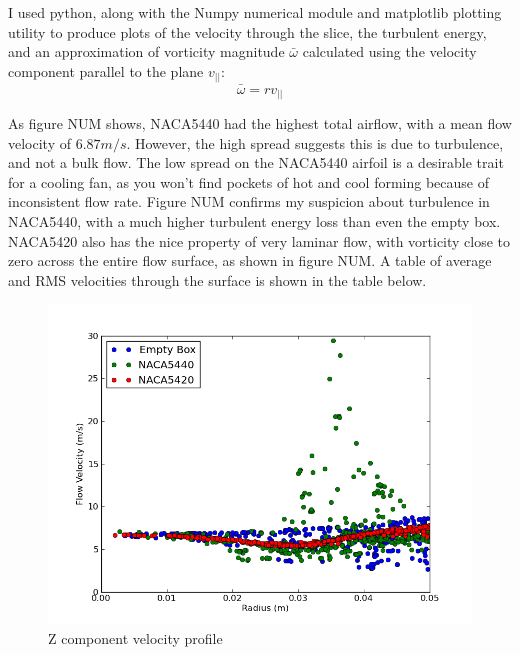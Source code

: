 \documentclass[12pt]{article}
\begin{document}
I used python, along with the Numpy numerical module and matplotlib plotting
utility to produce plots of the velocity through the slice, the turbulent energy, and an approximation of vorticity magnitude $\bar\omega$
calculated using the velocity component parallel to the plane $v_{||}$:
$$\bar\omega = rv_{||}$$


As figure NUM shows, NACA5440 had the highest total airflow, with a mean flow
velocity of $6.87m/s$.  However, the high spread suggests this is due to 
turbulence, and not a bulk flow.  The low spread on the NACA5440 airfoil 
is a desirable trait for a cooling fan, as you won't find pockets of hot
and cool forming because of inconsistent flow rate.  Figure NUM confirms my
suspicion about turbulence in NACA5440, with a much higher turbulent energy loss
than even the empty box.  NACA5420 also has the nice property of very laminar
flow, with vorticity close to zero across the entire flow surface, as shown in
figure NUM.  A table of average and RMS velocities through the surface is shown
in the table below.\\

\begin{figure}[H]
\centering
\includegraphics[width=5in, clip=true, trim=0in 0in 0.5in 0.5in]{../images/velocity_profile.png}
\caption{Z component velocity profile}
\end{figure}
\end{document}
